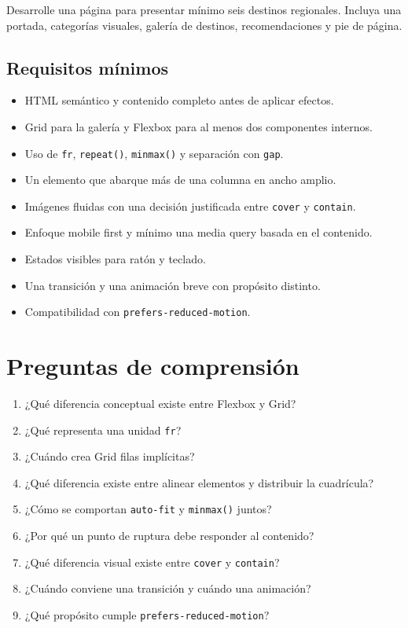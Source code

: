 \documentclass[11pt]{article}
\begin{document}
Desarrolle una página para presentar mínimo seis destinos regionales. Incluya una
portada, categorías visuales, galería de destinos, recomendaciones y pie de página.

\subsection{Requisitos mínimos}

\begin{itemize}
    \item HTML semántico y contenido completo antes de aplicar efectos.
    \item Grid para la galería y Flexbox para al menos dos componentes internos.
    \item Uso de \texttt{fr}, \texttt{repeat()}, \texttt{minmax()} y separación con \texttt{gap}.
    \item Un elemento que abarque más de una columna en ancho amplio.
    \item Imágenes fluidas con una decisión justificada entre \texttt{cover} y \texttt{contain}.
    \item Enfoque mobile first y mínimo una media query basada en el contenido.
    \item Estados visibles para ratón y teclado.
    \item Una transición y una animación breve con propósito distinto.
    \item Compatibilidad con \texttt{prefers-reduced-motion}.
\end{itemize}


\section{Preguntas de comprensión}

\begin{enumerate}
    \item ¿Qué diferencia conceptual existe entre Flexbox y Grid?
    \item ¿Qué representa una unidad \texttt{fr}?
    \item ¿Cuándo crea Grid filas implícitas?
    \item ¿Qué diferencia existe entre alinear elementos y distribuir la cuadrícula?
    \item ¿Cómo se comportan \texttt{auto-fit} y \texttt{minmax()} juntos?
    \item ¿Por qué un punto de ruptura debe responder al contenido?
    \item ¿Qué diferencia visual existe entre \texttt{cover} y \texttt{contain}?
    \item ¿Cuándo conviene una transición y cuándo una animación?
    \item ¿Qué propósito cumple \texttt{prefers-reduced-motion}?
\end{enumerate}
\end{document}
